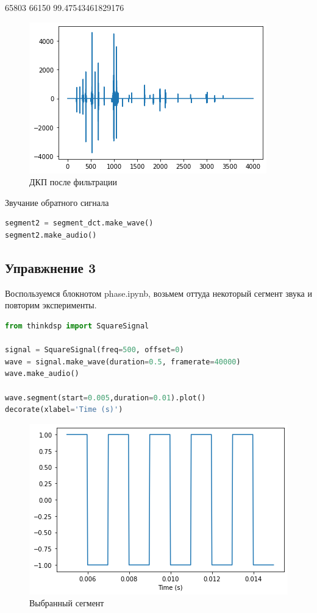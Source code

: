 65803	66150	99.47543461829176
\begin{figure}[H]
	\begin{center}
		\includegraphics[scale=1]{fig/lab06/lab06_06.png}
		\caption{ДКП после фильтрации}
	\end{center}
\end{figure}

Звучание обратного сигнала

\begin{lstlisting}[language=Python]
segment2 = segment_dct.make_wave()
segment2.make_audio()
\end{lstlisting}


\subsection{Управжнение 3}

Воспользуемся блокнотом phase.ipynb, возьмем оттуда некоторый сегмент звука и повторим эксперименты.

\begin{lstlisting}[language=Python]
from thinkdsp import SquareSignal

signal = SquareSignal(freq=500, offset=0)
wave = signal.make_wave(duration=0.5, framerate=40000)
wave.make_audio()

wave.segment(start=0.005,duration=0.01).plot()
decorate(xlabel='Time (s)')
\end{lstlisting}

\begin{figure}[H]
	\begin{center}
		\includegraphics[scale=1]{fig/lab06/lab06_07.png}
		\caption{Выбранный сегмент}
	\end{center}
\end{figure}

